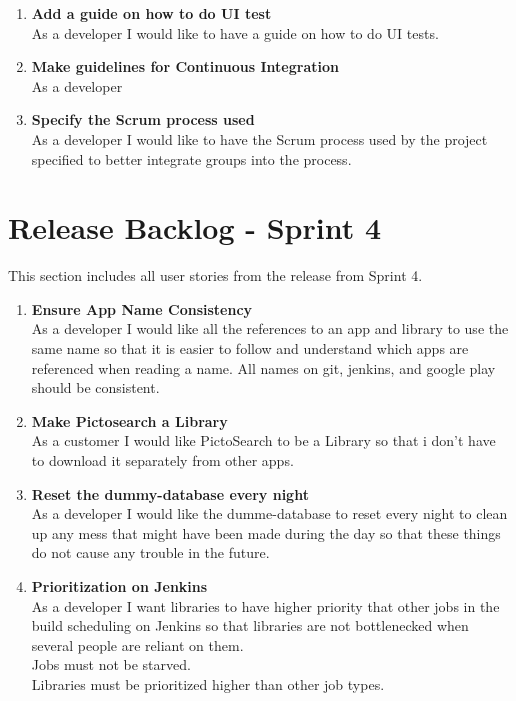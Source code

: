 \begin{enumerate}
\begin{enumerate}
\item \textbf{Add a guide on how to do UI test}\\
As a developer I would like to have a guide on how to do UI tests.

\item \textbf{Make guidelines for Continuous Integration}\\
As a developer 

\item \textbf{Specify the Scrum process used}\\
As a developer I would like to have the Scrum process used by the project specified to better integrate groups into the process.

\end{enumerate}

\section{Release Backlog - Sprint 4}
This section includes all user stories from the release from Sprint 4.

\begin{enumerate}

\item \textbf{Ensure App Name Consistency}\\
As a developer I would like all the references to an app and library to use the same name so that it is easier to follow and understand which apps are referenced when reading a name. All names on git, jenkins, and google play should be consistent.

\item \textbf{Make Pictosearch a Library}\\
As a customer I would like PictoSearch to be a Library so that i don’t have to download it separately from other apps.

\item \textbf{Reset the dummy-database every night}\\
As a developer I would like the dumme-database to reset every night to clean up any mess that might have been made during the day so that these things do not cause any trouble in the future.

\item \textbf{Prioritization on Jenkins}\\
As a developer I want libraries to have higher priority that other jobs in the build scheduling on Jenkins so that libraries are not bottlenecked when several people are reliant on them.\\
Jobs must not be starved.\\
Libraries must be prioritized higher than other job types.


\end{enumerate}
\end{enumerate}

